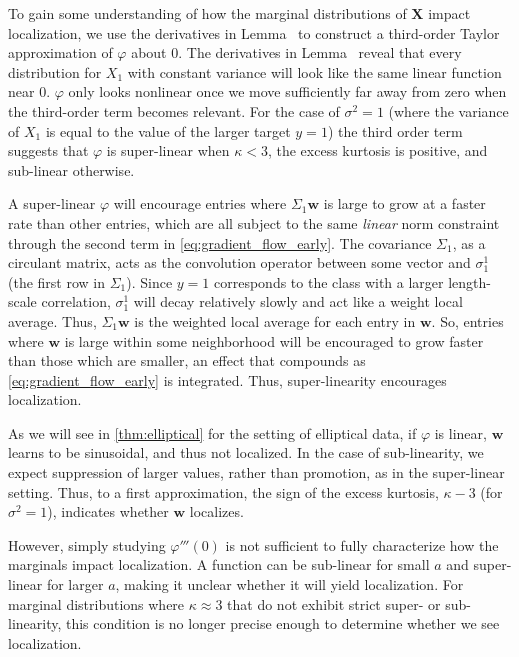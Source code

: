To gain some understanding of how the marginal distributions of $\mathbf{X}$ impact localization, we use the derivatives in Lemma~ 
to construct a third-order Taylor approximation of $\varphi$ about 0.
The derivatives in Lemma~ reveal that every distribution for $X_1$ with constant variance will look like the same linear function near 0.
$\varphi$ only looks nonlinear once we move sufficiently far away from zero when the third-order term becomes relevant.
For the case of $\sigma^2 = 1$ (where the variance of $X_1$ is equal to the value of the larger target $y=1$) the third order term suggests that $\varphi$ is super-linear when $\kappa < 3$, \ie the excess kurtosis is positive, and sub-linear otherwise.

A super-linear $\varphi$ will encourage entries where $\Sigma_1 \mathbf{w}$ is large to grow at a faster rate than other entries, which are all subject to the same \emph{linear} norm constraint through the second term in \cref{eq:gradient_flow_early}.
The covariance $\Sigma_1$, as a circulant matrix, acts as the convolution operator between some vector and $\sigma_1^1$ (the first row in $\Sigma_1$).
Since $y=1$ corresponds to the class with a larger length-scale correlation, $\sigma_1^1$ will decay relatively slowly and act like a weight local average.
Thus, $\Sigma_1 \mathbf{w}$ is the weighted local average for each entry in $\mathbf{w}$.
So, entries where $\mathbf{w}$ is large within some neighborhood will be encouraged to grow faster than those which are smaller, an effect that compounds as \cref{eq:gradient_flow_early} is integrated.
Thus, super-linearity encourages localization.

As we will see in \cref{thm:elliptical} for the setting of elliptical data, if $\varphi$ is linear, $\mathbf{w}$ learns to be sinusoidal, and thus not localized.
In the case of sub-linearity, we expect suppression of larger values, rather than promotion, as in the super-linear setting.
Thus, to a first approximation, the sign of the excess kurtosis, $\kappa - 3$ (for $\sigma^2 = 1$), indicates whether $\mathbf{w}$ localizes.

However, simply studying $\varphi'''(0)$ is not sufficient to fully characterize how the marginals impact localization.
A function can be sub-linear for small $a$ and super-linear for larger $a$, making it unclear whether it will yield localization.
For marginal distributions where $\kappa \approx 3$ that do not exhibit strict super- or sub-linearity, this condition is no longer precise enough to determine whether we see localization.


